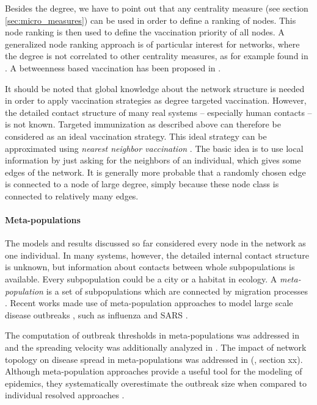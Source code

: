 \documentclass[openright,twoside,headsepline]{scrbook}
\begin{document}
Besides the degree, we have to point out that any centrality measure (see section \ref{sec:micro_measures}) can be used in order to define a ranking of nodes.
This node ranking is then used to define the vaccination priority of all nodes.
A generalized node ranking approach is of particular interest for networks, where the degree is not correlated to other centrality measures, as for example found in \citep{Guimera:2005p5232}.
A betweenness based vaccination has been proposed in \citep{holme:2002}.

It should be noted that global knowledge about the network structure is needed in order to apply vaccination strategies as degree targeted vaccination.
However, the detailed contact structure of many real systems -- especially human contacts -- is not known.
Targeted immunization as described above can therefore be considered as an ideal vaccination strategy.
This ideal strategy can be approximated using \emph{nearest neighbor vaccination} \citep{Cohen:PRL}.
The basic idea is to use local information by just asking for the neighbors of an individual, which gives some edges of the network.
It is generally more probable that a randomly chosen edge is connected to a node of large degree, simply because these node class is connected to relatively many edges.

\paragraph{Meta-populations\color{Cayenne}{.}}
The models and results discussed so far considered every node in the network as one individual.
In many systems, however, the detailed internal contact structure is unknown, but information about contacts between whole subpopulations is available.
Every subpopulation could be a city or a habitat in ecology. 
A \emph{meta-population} is a set of subpopulations which are connected by migration processes \citep{dynamical_processes,Hanski:1998,Grenfell:1997ts}.
Recent works made use of meta-population approaches to model large scale disease outbreaks \citep{VittoriaColizza02142006}, such as influenza \citep{DuyguBalcan12222009} and SARS \citep{Hufnagel:2004p27}.

The computation of outbreak thresholds in meta-populations was addressed in \citep{Colizza:2007p6276,Colizza:2007p5906} and the spreading velocity was additionally analyzed in \citep{Belik:2011ke}.
The impact of network topology on disease spread in meta-populations was addressed in (\citet{Lentz:2012pre}, section xx).
Although meta-population approaches provide a useful tool for the modeling of epidemics, they systematically overestimate the outbreak size when compared to individual resolved approaches \citep{Keeling11052010}.
\end{document}
